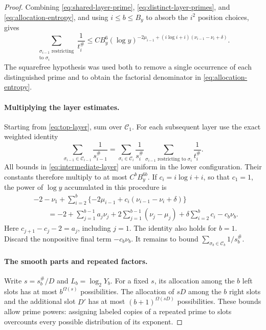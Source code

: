 \begin{proof}
Combining \eqref{eq:shared-layer-prime},
\eqref{eq:distinct-layer-primes}, and
\eqref{eq:allocation-entropy}, and using $i\le b\le B_y$ to
absorb the $i^2$ position choices, gives
\begin{equation}\label{eq:intermediate-layer}
 \sum_{\substack{\sigma_{i-1}\text{ restricting}\\
                  \text{to }\sigma_i}}\frac1{t_i^\#}
 \le CB_y^6
 (\log y)^{-2\mu_{i-1}+(i\log i+i)(\nu_{i-1}-\nu_i+\delta)}.
\end{equation}
The squarefree hypothesis was used both to remove a single
occurrence of each distinguished prime and to obtain the
factorial denominator in \eqref{eq:allocation-entropy}.

\paragraph{Multiplying the layer estimates.}
Starting from \eqref{eq:top-layer}, sum over $\mathcal C_1$.
For each subsequent layer use the exact weighted identity
\[
 \sum_{\sigma_{i-1}\in\mathcal C_{i-1}}\frac1{s_{i-1}^\#}
 =\sum_{\sigma_i\in\mathcal C_i}\frac1{s_i^\#}
   \sum_{\sigma_{i-1}\text{ restricting to }\sigma_i}
          \frac1{t_i^\#}.
\]
All bounds in \eqref{eq:intermediate-layer} are uniform in the
lower configuration.  Their constants therefore multiply to at
most $C^bB_y^{6b}$.  If $c_i=i\log i+i$, so that $c_1=1$, the
power of $\log y$ accumulated in this procedure is
\begin{align*}
 &-2-\nu_1+
   \sum_{i=2}^b\{-2\mu_{i-1}+c_i(\nu_{i-1}-\nu_i+\delta)\}\\
 &\qquad=-2+\sum_{j=1}^{b-1}a_j\nu_j
     +2\sum_{j=1}^{b-1}(\nu_j-\mu_j)
     +\delta\sum_{i=2}^b c_i-c_b\nu_b.
\end{align*}
Here $c_{j+1}-c_j-2=a_j$, including $j=1$.  The identity also
holds for $b=1$.  Discard the nonpositive final term
$-c_b\nu_b$.  It remains to bound
$\sum_{\sigma_b\in\mathcal C_b}1/s_b^\#$.

\paragraph{The smooth parts and repeated factors.}
Write $s=s_b^\#/D$ and $L_b=\log_2Y_b$.  For a fixed $s$, its
allocation among the $b$ left slots has at most $b^{\Omega(s)}$
possibilities.  The allocation of $sD$ among the $b$ right slots
and the additional slot $D'$ has at most
$(b+1)^{\Omega(sD)}$ possibilities.  These bounds allow prime
powers: assigning labeled copies of a repeated prime to slots
overcounts every possible distribution of its exponent.


\end{proof}
